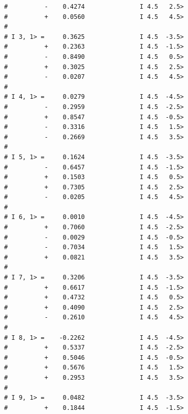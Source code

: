 \begin{enumerate}
{\begin{verbatim}
#          -    0.4274               I 4.5   2.5>              
#          +    0.0560               I 4.5   4.5>              
#                                                              
# I 3, 1> =     0.3625               I 4.5  -3.5>              
#          +    0.2363               I 4.5  -1.5>              
#          -    0.8490               I 4.5   0.5>              
#          +    0.3025               I 4.5   2.5>              
#          -    0.0207               I 4.5   4.5>              
#                                                              
# I 4, 1> =     0.0279               I 4.5  -4.5>              
#          -    0.2959               I 4.5  -2.5>              
#          +    0.8547               I 4.5  -0.5>              
#          -    0.3316               I 4.5   1.5>              
#          -    0.2669               I 4.5   3.5>              
#                                                              
# I 5, 1> =     0.1624               I 4.5  -3.5>              
#          -    0.6457               I 4.5  -1.5>              
#          +    0.1503               I 4.5   0.5>              
#          +    0.7305               I 4.5   2.5>              
#          -    0.0205               I 4.5   4.5>              
#                                                              
# I 6, 1> =     0.0010               I 4.5  -4.5>              
#          +    0.7060               I 4.5  -2.5>              
#          -    0.0029               I 4.5  -0.5>              
#          -    0.7034               I 4.5   1.5>              
#          +    0.0821               I 4.5   3.5>              
#                                                              
# I 7, 1> =     0.3206               I 4.5  -3.5>              
#          +    0.6617               I 4.5  -1.5>              
#          +    0.4732               I 4.5   0.5>              
#          +    0.4090               I 4.5   2.5>              
#          -    0.2610               I 4.5   4.5>              
#                                                              
# I 8, 1> =    -0.2262               I 4.5  -4.5>              
#          +    0.5337               I 4.5  -2.5>              
#          +    0.5046               I 4.5  -0.5>              
#          +    0.5676               I 4.5   1.5>              
#          +    0.2953               I 4.5   3.5>              
#                                                              
# I 9, 1> =     0.0482               I 4.5  -3.5>              
#          +    0.1844               I 4.5  -1.5>              

\end{verbatim}}
\end{enumerate}
